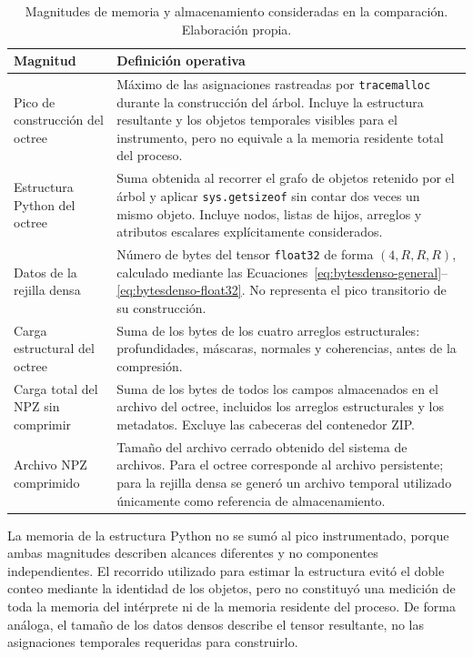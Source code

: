 \begin{table}[H]
\centering
\small
\caption{Magnitudes de memoria y almacenamiento consideradas en la comparación. Elaboración propia.}
\label{tab:memoria}
\begin{tabularx}{\textwidth}{@{}p{4.1cm}X@{}}
\toprule
Magnitud & Definición operativa \\
\midrule
Pico de construcción del octree &
Máximo de las asignaciones rastreadas por \texttt{tracemalloc} durante la construcción del árbol. Incluye la estructura resultante y los objetos temporales visibles para el instrumento, pero no equivale a la memoria residente total del proceso. \\

Estructura Python del octree &
Suma obtenida al recorrer el grafo de objetos retenido por el árbol y aplicar \texttt{sys.getsizeof} sin contar dos veces un mismo objeto. Incluye nodos, listas de hijos, arreglos y atributos escalares explícitamente considerados. \\

Datos de la rejilla densa &
Número de bytes del tensor \texttt{float32} de forma $(4,R,R,R)$, calculado mediante las Ecuaciones~\eqref{eq:bytesdenso-general}--\eqref{eq:bytesdenso-float32}. No representa el pico transitorio de su construcción. \\

Carga estructural del octree &
Suma de los bytes de los cuatro arreglos estructurales: profundidades, máscaras, normales y coherencias, antes de la compresión. \\

Carga total del NPZ sin comprimir &
Suma de los bytes de todos los campos almacenados en el archivo del octree, incluidos los arreglos estructurales y los metadatos. Excluye las cabeceras del contenedor ZIP. \\

Archivo NPZ comprimido &
Tamaño del archivo cerrado obtenido del sistema de archivos. Para el octree corresponde al archivo persistente; para la rejilla densa se generó un archivo temporal utilizado únicamente como referencia de almacenamiento. \\
\bottomrule
\end{tabularx}
\end{table}

La memoria de la estructura Python no se sumó al pico instrumentado, porque ambas magnitudes describen alcances diferentes y no componentes independientes. El recorrido utilizado para estimar la estructura evitó el doble conteo mediante la identidad de los objetos, pero no constituyó una medición de toda la memoria del intérprete ni de la memoria residente del proceso. De forma análoga, el tamaño de los datos densos describe el tensor resultante, no las asignaciones temporales requeridas para construirlo.

